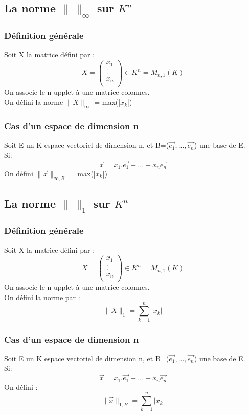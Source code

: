 \subsection{La norme $\parallel~\parallel_{\infty}$ sur $K^n$}
\subsubsection{Définition générale}
Soit X la matrice défini par : 
$$X =
\begin{pmatrix}
x_1 \\
. \\
. \\
x_n \\
\end{pmatrix} \in K^n = M_{n,1}(K)$$
On associe le n-upplet à une matrice colonnes.\\
On défini la norme $\parallel X \parallel_{\infty}$ = max(|$x_k$|)
\subsubsection{Cas d'un espace de dimension n}
Soit E un K espace vectoriel de dimension n, et B=($\overrightarrow{e_1},...,\overrightarrow{e_n}$) une base de E.\\
Si:
$$\overrightarrow{x} = x_1.\overrightarrow{e_1}+...+x_n\overrightarrow{e_n}$$
On défini $\parallel\overrightarrow{x}\parallel_{\infty,B}$ = max(|$x_k$|)
\subsection{La norme $\parallel~\parallel_{1}$ sur $K^n$}
\subsubsection{Définition générale}
Soit X la matrice défini par : 
$$X =
\begin{pmatrix}
x_1 \\
. \\
. \\
x_n \\
\end{pmatrix} \in K^n = M_{n,1}(K)$$
On associe le n-upplet à une matrice colonnes.\\
On défini la norme par : 
$$\parallel X \parallel_{1} = \sum_{k=1}^n |x_k|$$
\subsubsection{Cas d'un espace de dimension n}
Soit E un K espace vectoriel de dimension n, et B=($\overrightarrow{e_1},...,\overrightarrow{e_n}$) une base de E.\\
Si:
$$\overrightarrow{x} = x_1.\overrightarrow{e_1}+...+x_n\overrightarrow{e_n}$$
On défini :
$$\parallel\overrightarrow{x}\parallel_{1,B} = \sum_{k=1}^n |x_k|$$
